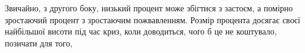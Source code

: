 Звичайно, з другого боку, низький процент може збігтися з
застоєм, а помірно зростаючий процент з зростаючим пожвавленням.
Розмір процента досягає своєї найбільшої висоти під час криз,
коли доводиться, чого б це не коштувало, позичати для того,
\parbreak{}  %
